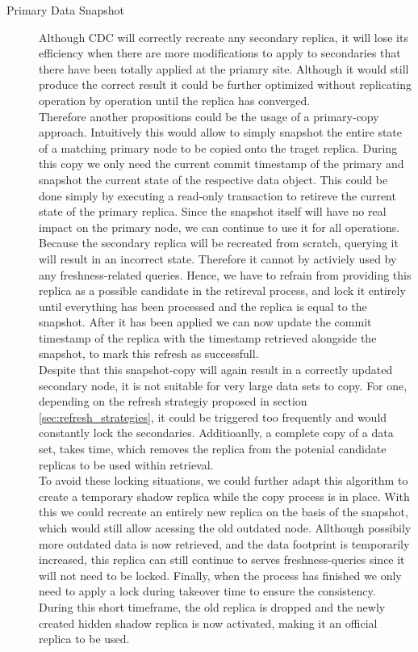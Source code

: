 \begin{description}




    \item [Primary Data Snapshot]
    Although CDC will correctly recreate any secondary replica, it will lose its efficiency when there are more modifications to apply to secondaries that there 
    have been totally applied at the priamry site. Although it would still produce the correct result it could be further optimized without replicating operation by operation 
    until the replica has converged.\\
    Therefore another propositions could be the usage of a primary-copy approach. 
    Intuitively this would allow to simply snapshot the entire state of a matching primary node to be copied onto the traget replica.
    During this copy we only need the current commit timestamp of the primary and snapshot the current state of the respective data object. 
    This could be done simply by executing a read-only transaction to retireve the current state of the primary replica.
    Since the snapshot itself will have no real impact on the primary node, we can continue to use it for all operations.
    Because the secondary replica will be recreated from scratch, querying it will result in an incorrect state. 
    Therefore it cannot by activiely used by any freshness-related queries.
    Hence, we have to refrain from providing this replica as a possible candidate in the retireval process, and lock it entirely 
    until everything has been processed and the replica is equal to the snapshot. After it has been applied we can now update the commit timestamp of the replica
    with the timestamp retrieved alongside the snapshot, to mark this refresh as successfull.\\
    Despite that this snapshot-copy will again result in a correctly updated secondary node, it is not suitable for very large data sets to copy.  
    For one, depending on the refresh strategiy proposed in section \ref{sec:refresh_strategies}, it could be triggered too frequently and would constantly lock the 
    secondaries. Additioanlly, a complete copy of a data set, takes time, which removes the replica from the potenial candidate replicas to be used within retrieval.\\
    To avoid these locking situations, we could further adapt this algorithm to create a temporary shadow replica while the copy process is in place.
    With this we could recreate an entirely new replica on the basis of the snapshot, which would still allow acessing the old outdated node.
    Allthough possibily more outdated data is now retrieved, and the data footprint is temporarily increased, this replica can still continue to serves freshness-queries 
    since it will not need to be locked.
    Finally, when the process has finished we only need to apply a lock during takeover time to ensure the consistency. During this short timeframe, the old replica is dropped
    and the newly created hidden shadow replica is now activated, making it an official replica to be used.




\end{description}
